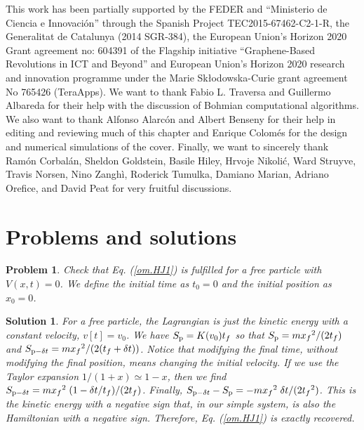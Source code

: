 \documentclass[nofootinbib, secnumarabic, amsmath, nobibnotes,11pt,aps,pra, floatfix]{revtex4-1}
\newtheorem{problem}{Problem}
\newtheorem{solution}{Solution}
\newcommand{\eref}[1]{Eq. (\ref{#1})}
\begin{document}
This work has been partially supported by the FEDER and  ``Ministerio de Ciencia e Innovaci\'{o}n'' through the Spanish Project TEC2015-67462-C2-1-R,  the Generalitat de Catalunya (2014 SGR-384),  the European Union’s Horizon 2020 Grant agreement no: 604391 of the Flagship initiative  ``Graphene-Based Revolutions in ICT and Beyond'' and European Union’s Horizon 2020 research and innovation programme under the Marie Skłodowska-Curie grant agreement No 765426 (TeraApps).  We want to thank Fabio L. Traversa and Guillermo Albareda for their help with the discussion of Bohmian
computational algorithms. We also want to thank Alfonso Alarc\'{o}n and
Albert Benseny for their help in editing and reviewing much of this
chapter and Enrique Colom\'{e}s for the design and numerical simulations of the cover. Finally, we want to sincerely thank Ram\'on Corbal\'an,
Sheldon Goldstein, Basile Hiley, Hrvoje Nikoli\'c, Ward Struyve, Travis Norsen, Nino Zangh\`i, Roderick Tumulka, Damiano Marian, Adriano Orefice,
and David Peat for very fruitful discussions.\vspace*{-9pt}\\

\section{Problems and solutions}

\begin{problem} \label{om.p1}
Check that \eref{om.HJ1} is fulfilled for a free particle with
$V(x,t) = 0$. We define the initial time as $t_0 = 0$ and the initial
position as $x_0 = 0$.
\end{problem}

\begin{solution}
For a free particle, the Lagrangian is just the kinetic energy with
a constant velocity, $v[t] = v_0$. We have $S_{\rm p} = K(v_0) t_f$
so that $S_{\rm p} = m {x_f}^2/(2 t_f)$ and $S_{{\rm p}-\delta t} =
m {x_f}^2/( 2 (t_f + \delta t))$. Notice that modifying the final
time, without modifying the final position, means changing the
initial velocity. If we use the Taylor expansion  $1/(1 + x)\simeq
1-x$, then we find $S_{{\rm p} - \delta t} = m {x_f}^2 \; (1 -
\delta t/t_f)/(2 t_f)$. Finally, $S_{{\rm p} - \delta t} - S_{\rm p}
= -m {x_f}^2 \; \delta t/(2{t_f}^2)$. This is the kinetic energy
with a negative sign that, in our simple system, is also the
Hamiltonian with a negative sign. Therefore, \eref{om.HJ1} is
exactly recovered.
\end{solution}
\end{document}
